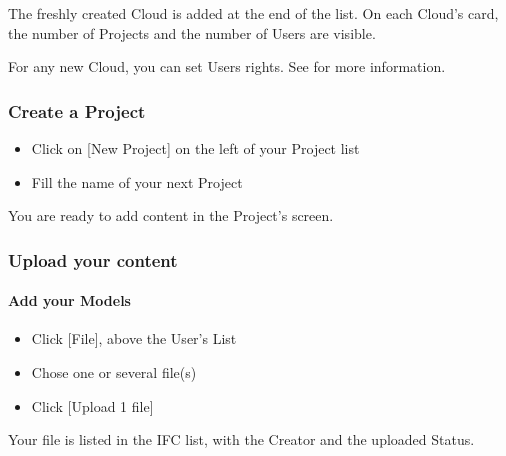\documentclass[a4paper,12pt,english]{sphinxmanual}
\begin{document}
The freshly created Cloud is added at the end of the list.
On each Cloud’s card, the number of Projects and the number of Users are visible.

For any new Cloud, you can set Users rights. See  for more information.


\subsubsection{Create a Project}
\label{\detokenize{platform/add_content:create-a-project}}
\begin{itemize}
\item {} 
Click on {[}New Project{]} on the left of your Project list

\item {} 
Fill the name of your next Project

\end{itemize}

You are ready to add content in the Project’s screen.


\subsubsection{Upload your content}
\label{\detokenize{platform/add_content:upload-your-content}}

\paragraph{Add your Models}
\label{\detokenize{platform/add_content:add-your-models}}\begin{itemize}
\item {} 
 Click {[}File{]}, above the User’s List

\item {} 
Chose one or several file(s)

\item {} 
Click {[}Upload 1 file{]}

\end{itemize}

Your file is listed in the IFC list, with the Creator and the uploaded Status.
\end{document}
